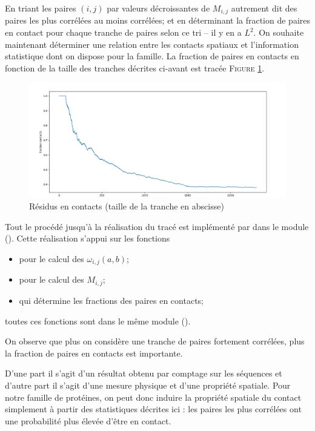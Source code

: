 \documentclass[a4paper, french]{article}
\begin{document}
En triant les paires $(i,j)$ par valeurs
d\'ecroissantes de $M_{i,j}$ autrement dit des paires les plus corr\'el\'ees
au moins corr\'el\'ees; et en d\'eterminant la fraction de paires en contact
pour chaque tranche de paires selon ce tri -- il y en a $L^2$.
On souhaite maintenant d\'eterminer 
une relation entre les contacts spatiaux et l'information statistique
dont on dispose pour la famille.  
La fraction de paires en contacts en fonction de la taille
des tranches d\'ecrites ci-avant est trac\'ee
F\textsc{igure} \ref{fig:contacts}.

\begin{figure}[h]
    \begin{center}
    \includegraphics[width=15cm]{images/contacts.png}
    \caption{R\'esidus en contacts (taille de la tranche en abscisse)}
    \label{fig:contacts}
    \end{center}
\end{figure}

Tout le proc\'ed\'e jusqu'\`a la r\'ealisation du trac\'e est impl\'ement\'e
par  dans le module  ().
Cette r\'ealisation s'appui sur les fonctions
\begin{itemize}
    \item {}
        pour le calcul des $\omega_{i,j}(a,b)$;
    \item {}
        pour le calcul des $M_{i,j}$;
    \item {}
        qui d\'etermine les fractions des paires en contacts;
\end{itemize}
toutes ces fonctions sont dans le m\^eme module ().

On observe que plus on consid\`ere une tranche de paires fortement 
corr\'el\'ees, plus la fraction de paires en contacts est importante.

D'une part il s'agit d'un r\'esultat obtenu par comptage sur les
s\'equences et d'autre part il s'agit d'une mesure physique et d'une
propri\'et\'e spatiale.
Pour notre famille de prot\'eines, on peut donc induire la propri\'et\'e
spatiale du contact simplement \`a partir des statistiques d\'ecrites ici :
les paires les plus corr\'el\'ees ont une probabilit\'e plus \'elev\'ee
d'\^etre en contact.
\end{document}

